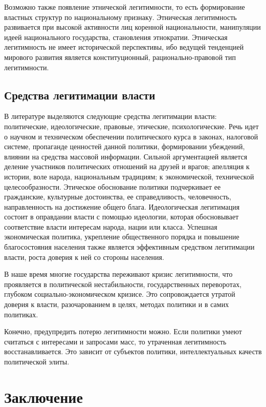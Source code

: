 Возможно также появление этнической легитимности, то есть формирование властных
структур по национальному признаку. Этническая легитимность развивается при
высокой активности лиц коренной национальности, манипуляции идеей национального
государства, становления этнократии. Этническая легитимность не имеет
исторической перспективы, ибо ведущей тенденцией мирового развития является
конституционный, рационально-правовой тип легитимности.

\vspace*{2em}
\section{Средства легитимации власти}

В литературе выделяются следующие средства легитимации власти: политические,
идеологические, правовые, этические, психологические. Речь идет о научном и
техническом обеспечении политического курса в законах, налоговой системе,
пропаганде ценностей данной политики, формировании убеждений, влиянии на
средства массовой информации. Сильной аргументацией является деление участников
политических отношений на друзей и врагов; апелляция к истории, воле народа,
национальным традициям; к экономической, технической целесообразности.
Этическое обоснование политики подчеркивает ее гражданские, культурные
достоинства, ее справедливость, человечность, направленность на достижение
общего блага. Идеологическая легитимация состоит в оправдании власти с помощью
идеологии, которая обосновывает соответствие власти интересам народа, нации или
класса. Успешная экономическая политика, укрепление общественного порядка и
повышение благосостояния населения также является эффективным средством
легитимации власти, роста доверия к ней со стороны населения.

В наше время многие государства переживают кризис легитимности, что проявляется
в политической нестабильности, государственных переворотах, глубоком
социально-экономическом кризисе. Это сопровождается утратой доверия к власти,
разочарованием в целях, методах политики и в самих политиках.

Конечно, предупредить потерю легитимности можно. Если политики умеют считаться
с интересами и запросами масс, то утраченная легитимность восстанавливается.
Это зависит от субъектов политики, интеллектуальных качеств политической элиты.

\pagebreak %

\chapter*{Заключение}


